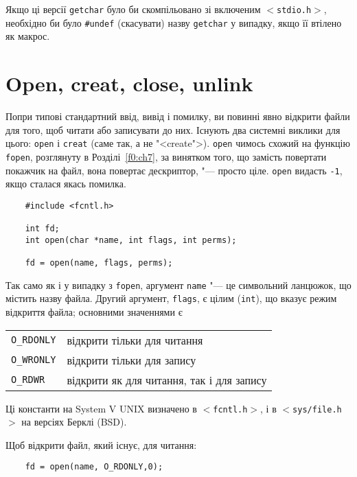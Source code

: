 \documentclass[a4paper,12pt]{book}
\begin{document}
  Якщо ці версії \texttt{getchar} було би скомпільовано зі включеним
  \texttt{\mbox{$<$}stdio.h\mbox{$>$}}, необхідно би було \texttt{\#undef} (скасувати) назву
  \texttt{getchar} у випадку, якщо її втілено як макрос.

\section{Open, creat, close, unlink}


  Попри типові стандартний ввід, вивід і помилку, ви повинні явно відкрити файли для того,
  щоб читати або записувати до них. Існують два системні виклики для цього: \texttt{open}
  і \texttt{creat} (саме так, а не "<create">). \texttt{open} чимось схожий на
  функцію \texttt{fopen}, розглянуту в Розділі~\ref{f0:ch7}, за винятком того, що
  замість повертати покажчик на файл, вона повертає дескриптор, "--- просто ціле.
  \texttt{open} видасть \texttt{-1}, якщо сталася якась помилка.
  \begin{verbatim}
    #include <fcntl.h>

    int fd;
    int open(char *name, int flags, int perms);

    fd = open(name, flags, perms);
  \end{verbatim}

  Так само як і у випадку з \texttt{fopen}, аргумент \texttt{name} "--- це символьний
  ланцюжок, що містить назву файла. Другий аргумент, \texttt{flags}, є цілим
  (\texttt{int}), що вказує режим відкриття файла; основними значеннями є

  \vspace{12pt}
  \begin{tabular}{ll}
  \texttt{O\_RDONLY} & відкрити тільки для читання \\
  \texttt{O\_WRONLY} & відкрити тільки для запису \\
  \texttt{O\_RDWR} & відкрити як для читання, так і для запису \\
  \end{tabular}
  \vspace{12pt}

  Ці константи на System V UNIX визначено в \texttt{\mbox{$<$}fcntl.h\mbox{$>$}}, і в
  \texttt{\mbox{$<$}sys/file.h\mbox{$>$}} на версіях Берклі (BSD).

  Щоб відкрити файл, який існує, для читання:
  \begin{verbatim}
    fd = open(name, O_RDONLY,0);
  \end{verbatim}
\end{document}
